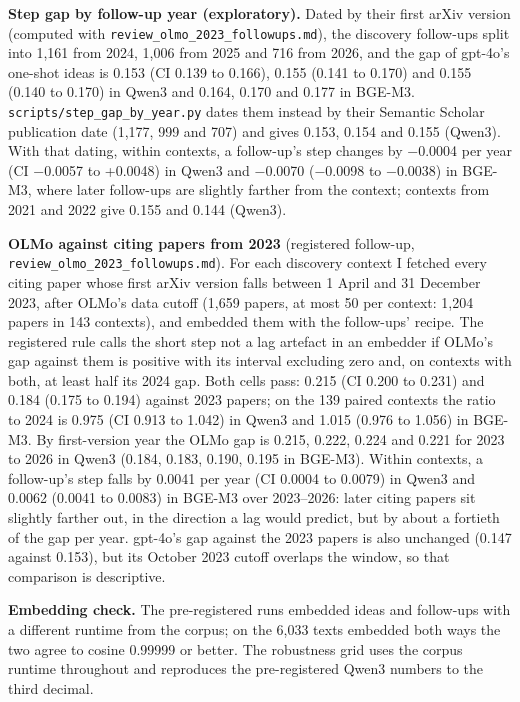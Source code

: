 \documentclass[
  10pt,
]{article}
\begin{document}
\textbf{Step gap by follow-up year
(exploratory).} Dated by their first
arXiv version (computed with
\texttt{review\_\allowbreak{}olmo\_\allowbreak{}2023\_\allowbreak{}followups.md}),
the discovery follow-ups split into
1,161 from 2024, 1,006 from 2025 and 716
from 2026, and the gap of gpt-4o's
one-shot ideas is 0.153 (CI 0.139 to
0.166), 0.155 (0.141 to 0.170) and 0.155
(0.140 to 0.170) in Qwen3 and 0.164,
0.170 and 0.177 in BGE-M3.
\texttt{scripts/\allowbreak{}step\_\allowbreak{}gap\_\allowbreak{}by\_\allowbreak{}year.py}
dates them instead by their Semantic
Scholar publication date (1,177, 999 and
707) and gives 0.153, 0.154 and 0.155
(Qwen3). With that dating, within
contexts, a follow-up's step changes by
−0.0004 per year (CI −0.0057 to +0.0048)
in Qwen3 and −0.0070 (−0.0098 to
−0.0038) in BGE-M3, where later
follow-ups are slightly farther from the
context; contexts from 2021 and 2022
give 0.155 and 0.144 (Qwen3).

\textbf{OLMo against citing papers from
2023} (registered follow-up,
\texttt{review\_\allowbreak{}olmo\_\allowbreak{}2023\_\allowbreak{}followups.md}).
For each discovery context I fetched
every citing paper whose first arXiv
version falls between 1 April and 31
December 2023, after OLMo's data cutoff
(1,659 papers, at most 50 per context:
1,204 papers in 143 contexts), and
embedded them with the follow-ups'
recipe. The registered rule calls the
short step not a lag artefact in an
embedder if OLMo's gap against them is
positive with its interval excluding
zero and, on contexts with both, at
least half its 2024 gap. Both cells
pass: 0.215 (CI 0.200 to 0.231) and
0.184 (0.175 to 0.194) against 2023
papers; on the 139 paired contexts the
ratio to 2024 is 0.975 (CI 0.913 to
1.042) in Qwen3 and 1.015 (0.976 to
1.056) in BGE-M3. By first-version year
the OLMo gap is 0.215, 0.222, 0.224 and
0.221 for 2023 to 2026 in Qwen3 (0.184,
0.183, 0.190, 0.195 in BGE-M3). Within
contexts, a follow-up's step falls by
0.0041 per year (CI 0.0004 to 0.0079) in
Qwen3 and 0.0062 (0.0041 to 0.0083) in
BGE-M3 over 2023--2026: later citing
papers sit slightly farther out, in the
direction a lag would predict, but by
about a fortieth of the gap per year.
gpt-4o's gap against the 2023 papers is
also unchanged (0.147 against 0.153),
but its October 2023 cutoff overlaps the
window, so that comparison is
descriptive.

\textbf{Embedding check.} The
pre-registered runs embedded ideas and
follow-ups with a different runtime from
the corpus; on the 6,033 texts embedded
both ways the two agree to cosine
0.99999 or better. The robustness grid
uses the corpus runtime throughout and
reproduces the pre-registered Qwen3
numbers to the third decimal.
\end{document}
